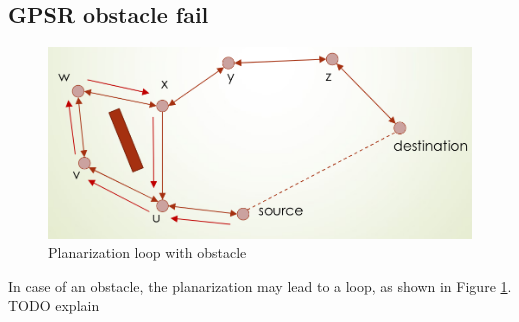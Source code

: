\subsection{GPSR obstacle fail}
\begin{figure}[htbp]
   \centering
   \includegraphics{images/wsn_planarization4.png}
   \caption{Planarization loop with obstacle}
   \label{fig:wsn_planarization4}
\end{figure}
In case of an obstacle, the planarization may lead to a loop, as shown in Figure \ref{fig:wsn_planarization4}.
TODO explain